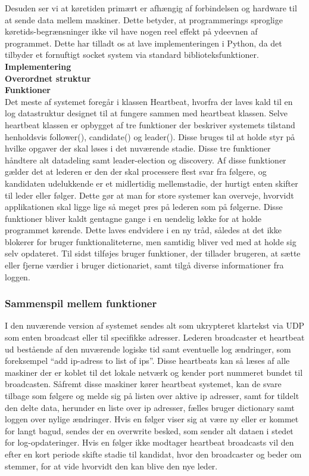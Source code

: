 \documentclass[a4paper,12pt]{article}
\begin{document}
Desuden ser vi at køretiden primært er afhængig af forbindelsen og hardware til at sende data mellem maskiner. Dette betyder, at programmerings sproglige køretids-begrænsninger ikke vil have nogen reel effekt på ydeevnen af programmet. Dette har tilladt os at lave implementeringen i Python, da det tilbyder et fornuftigt socket system via standard biblioteksfunktioner.
\\
\textbf{Implementering} 
\\
\textbf{Overordnet struktur} 
\\
\textbf{Funktioner} 
\\
Det meste af systemet foregår i klassen Heartbeat, hvorfra der laves kald til en log datastruktur designet til at fungere sammen med heartbeat klassen. Selve heartbeat klassen er opbygget af tre funktioner der beskriver systemets tilstand henholdsvis follower(), candidate() og leader(). Disse bruges til at holde styr på hvilke opgaver der skal løses i det nuværende stadie. Disse tre funktioner håndtere alt datadeling samt leader-election og discovery.
Af disse funktioner gælder det at lederen er den der skal processere flest svar fra følgere, og kandidaten udelukkende er et midlertidig mellemstadie, der hurtigt enten skifter til leder eller følger. Dette gør at man for store systemer kan overveje, hvorvidt applikationen skal ligge lige så meget pres på lederen som på følgerne.
Disse funktioner bliver kaldt gentagne gange i en uendelig løkke for at holde programmet kørende. Dette laves endvidere i en ny tråd, således at det ikke blokerer for bruger funktionaliteterne, men samtidig bliver ved med at holde sig selv opdateret.
Til sidst tilføjes bruger funktioner, der tillader brugeren, at sætte eller fjerne værdier i bruger dictionariet, samt tilgå diverse informationer fra loggen.
 \\
\subsubsection{Sammenspil mellem funktioner}
I den nuværende version af systemet sendes alt som ukrypteret klartekst via UDP som enten broadcast eller til specifikke adresser. Lederen broadcaster et heartbeat ud bestående af den nuværende logiske tid samt eventuelle log ændringer, som foreksempel “add ip-adress to list of ips”.  Disse heartbeats kan så læses af alle maskiner der er koblet til det lokale netværk og kender port nummeret bundet til broadcasten. Såfremt disse maskiner kører heartbeat systemet, kan de svare tilbage som følgere og melde sig på listen over aktive ip adresser, samt for tildelt den delte data, herunder en liste over ip adresser, fælles bruger dictionary samt loggen over nylige ændringer. Hvis en følger viser sig at være ny eller er kommet for langt bagud, sendes der en overwrite besked, som sender alt dataen i stedet for log-opdateringer. Hvis en følger ikke modtager heartbeat broadcasts vil den efter en kort periode skifte stadie til kandidat, hvor den broadcaster og beder om stemmer, for at vide hvorvidt den kan blive den nye leder.
\end{document}
